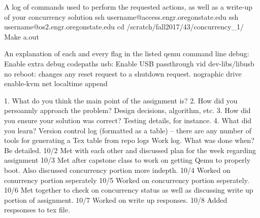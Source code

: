 \documentclass[letterpaper,10pt,titlepage]{article}
\begin{document}
A log of commands used to perform the requested actions, as well as a write-up of your concurrency solution
    ssh username@access.engr.oregonstate.edu
    ssh username@os2.engr.oregonstate.edu
    cd /scratch/fall2017/43/concurrency_1/
    Make
    a.out

   
An explanation of each and every flag in the listed qemu command line
    debug: Enable extra debug codepaths
    usb: Enable USB passthrough vid dev-libs/libusb
    no reboot: changes any reset request to a shutdown request.
    nographic
    drive
    enable-kvm
    net
    localtime
    append

1. What do you think the main point of the assignment is?
2. How did you persoannly approach the problem? Design decisions, algorithm, etc.
3. How did you ensure your solution was correct? Testing details, for instance.
4. What did you learn?
Version control log (formatted as a table) -- there are any number of tools for generating a Tex table from repo logs
Work log. What was done when? Be detailed.
    10/2 Met with each other and discussed plan for the week regarding assignment
    10/3 Met after capstone class to work on getting Qemu to properly boot. Also discussed concurrency portion more indepth.
    10/4 Worked on conurrency portion seperately
    10/5 Worked on concurrency portion seperately.
    10/6 Met together to check on concurrency status as well as discussing write up portion of assignment.
    10/7 Worked on write up responses.
    10/8 Added respsonses to tex file.



\end{document}
